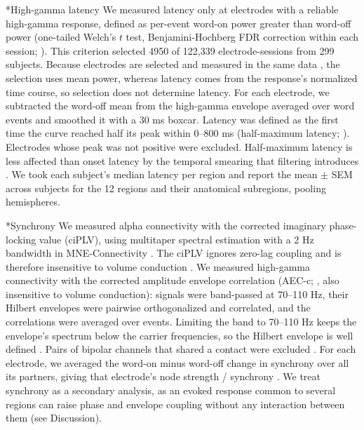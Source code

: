 \documentclass[10pt,twocolumn]{article}  %
\makeatletter
\renewcommand\subsection{\@startsection{subsection}{2}{\z@}{-8pt plus -2pt minus -1pt}{2pt}{\raggedright\sffamily\bfseries\normalsize}}
\makeatother
\begin{document}
\subsection*{High-gamma latency}\label{high-gamma-latency}
We measured latency only at electrodes with a reliable high-gamma response, defined as per-event word-on power greater than word-off power (one-tailed Welch's $t$ test, Benjamini-Hochberg FDR correction within each session; \citealp{WELCH_1947,Benjamini_1995}). This criterion selected 4950 of 122,339 electrode-sessions from 299 subjects. Because electrodes are selected and measured in the same data \citep{Kriegeskorte_2009}, the selection uses mean power, whereas latency comes from the response's normalized time course, so selection does not determine latency. For each electrode, we subtracted the word-off mean from the high-gamma envelope averaged over word events and smoothed it with a 30 ms boxcar. Latency was defined as the first time the curve reached half its peak within 0--800 ms (half-maximum latency; \citealp{Kiesel_2007,Liesefeld_2018}). Electrodes whose peak was not positive were excluded. Half-maximum latency is less affected than onset latency by the temporal smearing that filtering introduces \citep{VanRullen_2011}. We took each subject's median latency per region and report the mean $\pm$ SEM across subjects for the 12 regions and their anatomical subregions, pooling hemispheres.

\subsection*{Synchrony}\label{synchrony}
We measured alpha connectivity with the corrected imaginary phase-locking value (ciPLV), using multitaper spectral estimation with a 2 Hz bandwidth in MNE-Connectivity \citep{Gramfort_2013}. The ciPLV ignores zero-lag coupling and is therefore insensitive to volume conduction \citep{Nolte_2004,Bruna_2018}. We measured high-gamma connectivity with the corrected amplitude envelope correlation (AEC-c; \citealp{Hipp_2012}, also insensitive to volume conduction): signals were band-passed at 70--110 Hz, their Hilbert envelopes were pairwise orthogonalized and correlated, and the correlations were averaged over events. Limiting the band to 70--110 Hz keeps the envelope's spectrum below the carrier frequencies, so the Hilbert envelope is well defined \citep{Bedrosian_1963}. Pairs of bipolar channels that shared a contact were excluded \citep{Mercier_2017}. For each electrode, we averaged the word-on minus word-off change in synchrony over all its partners, giving that electrode's node strength / synchrony \citep{Rao_2025}. We treat synchrony as a secondary analysis, as an evoked response common to several regions can raise phase and envelope coupling without any interaction between them (see Discussion).
\end{document}
